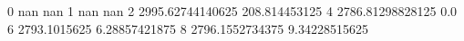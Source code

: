 0 nan nan
1 nan nan
2 2995.62744140625 208.814453125
4 2786.81298828125 0.0
6 2793.1015625 6.28857421875
8 2796.1552734375 9.34228515625
